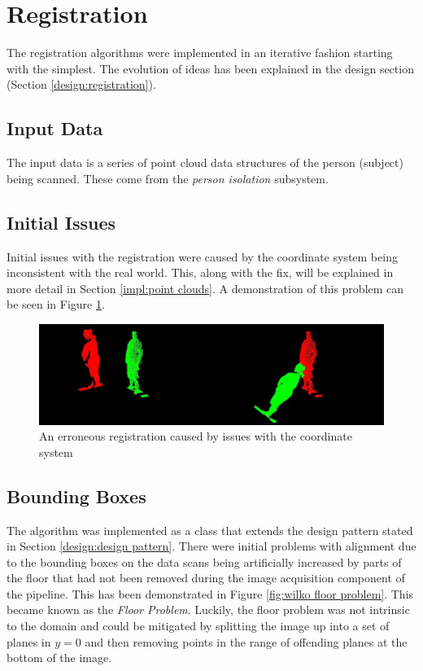 \section{Registration}
\label{imp:stitching}
The registration algorithms were implemented in an iterative fashion starting with the simplest. The evolution of ideas has been explained in the design section (Section \ref{design:registration}). \\

\subsection{Input Data}
The input data is a series of point cloud data structures of the person (subject) being scanned. These come from the \emph{person isolation} subsystem. 

\subsection{Initial Issues}
Initial issues with the registration were caused by the coordinate system being inconsistent with the real world. This, along with the fix, will be explained in more detail in Section \ref{impl:point clouds}. A demonstration of this problem can be seen in Figure \ref{fig:wilko poor reg}. \\

\begin{figure}[h!]
    \begin{center}
        \includegraphics[scale=0.3]{zscreenshots/poor-wilko.jpg}
        \caption{An erroneous registration caused by issues with the coordinate system}
        \label{fig:wilko poor reg}
    \end{center}
\end{figure}

\subsection{Bounding Boxes}
The algorithm was implemented as a class that extends the design pattern stated in Section \ref{design:design pattern}. There were initial problems with alignment due to the bounding boxes on the data scans being artificially increased by parts of the floor that had not been removed during the image acquisition component of the pipeline. This has been demonstrated in Figure \ref{fig:wilko floor problem}. This became known as the \emph{Floor Problem}. Luckily, the floor problem was not intrinsic to the domain and could be mitigated by splitting the image up into a set of planes in $y = 0$ and then removing points in the range of offending planes at the bottom of the image. \\

